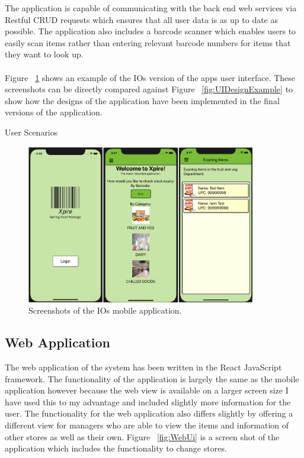 \documentclass[a4paper,11pt]{report}
\begin{document}
The application is capable of communicating with the back end web services via Restful CRUD requests which ensures that all user data is as up to date as possible.
The application also includes a barcode scanner which enables users to easily scan items rather than entering relevant barcode numbers for items that they want to look up. 
\\
\\
Figure ~\ref{fig:IOSScreenshots} shows an example of the IOs version of the apps user interface. These screenshots can be directly compared against Figure ~\ref{fig:UIDesignExample}
 to show how the designs of the application have been implemented in the final versions of the application.

User Scenarios

\begin{figure}[H]
    \centering
    \includegraphics[width=10cm]{./assets/images/appUI.png}
    \caption{Screenshots of the IOs mobile application.}
    \label{fig:IOSScreenshots}
\end{figure}

\subsection{Web Application}
The web application of the system has been written in the React JavaScript framework. The functionality of the application is largely the same as the mobile application however because the web view is available on a larger screen size I have used this to my advantage and included slightly more information for the user. 
The functionality for the web application also differs slightly by offering a different view for managers who are able to view the items and information of other stores as well as their own. 
Figure ~\ref{fig:WebUi} is a screen shot of the application which includes the functionality to change stores.
\end{document}
